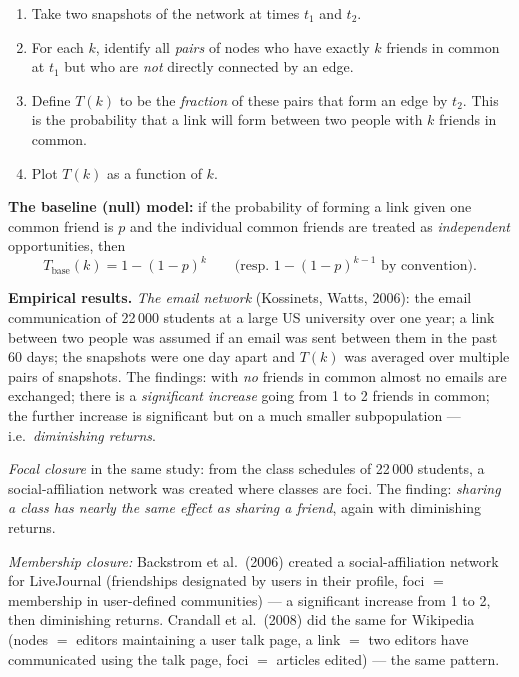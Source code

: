 \documentclass[11pt,a4paper]{article}
\theoremstyle{definition}
\begin{document}
\begin{defbox}
\begin{enumerate}
\item Take two snapshots of the network at times $t_1$ and $t_2$.
\item For each $k$, identify all \emph{pairs} of nodes who have exactly $k$ friends in common at
      $t_1$ but who are \emph{not} directly connected by an edge.
\item Define $T(k)$ to be the \emph{fraction} of these pairs that form an edge by $t_2$. This is the
      probability that a link will form between two people with $k$ friends in common.
\item Plot $T(k)$ as a function of $k$.
\end{enumerate}

\textbf{The baseline (null) model:} if the probability of forming a link given one common friend is
$p$ and the individual common friends are treated as \emph{independent} opportunities, then
\[ T_{\text{base}}(k)=1-(1-p)^{k}\qquad\text{(resp.\ }1-(1-p)^{k-1}\text{ by convention).} \]
\end{defbox}

\textbf{Empirical results.} \emph{The email network} (Kossinets, Watts, 2006): the email communication
of 22\,000 students at a large US university over one year; a link between two people was assumed if
an email was sent between them in the past 60 days; the snapshots were one day apart and $T(k)$ was
averaged over multiple pairs of snapshots. The findings: with \emph{no} friends in common almost no
emails are exchanged; there is a \emph{significant increase} going from 1 to 2 friends in common; the
further increase is significant but on a much smaller subpopulation --- i.e.\ \emph{diminishing
returns}.

\emph{Focal closure} in the same study: from the class schedules of 22\,000 students, a
social-affiliation network was created where classes are foci. The finding: \emph{sharing a class has
nearly the same effect as sharing a friend}, again with diminishing returns.

\emph{Membership closure:} Backstrom et al.\ (2006) created a social-affiliation network for
LiveJournal (friendships designated by users in their profile, foci $=$ membership in user-defined
communities) --- a significant increase from 1 to 2, then diminishing returns. Crandall et al.\
(2008) did the same for Wikipedia (nodes $=$ editors maintaining a user talk page, a link $=$ two
editors have communicated using the talk page, foci $=$ articles edited) --- the same pattern.
\end{document}
